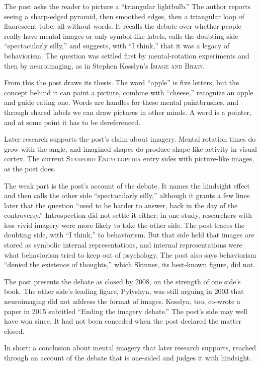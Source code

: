 \begin{afterword}
\summaryhead

The post asks the reader to picture a ``triangular lightbulb.'' The author reports seeing a sharp-edged pyramid, then smoothed edges, then a triangular loop of fluorescent tube, all without words. It recalls the debate over whether people really have mental images or only symbol-like labels, calls the doubting side ``spectacularly silly,'' and suggests, with ``I think,'' that it was a legacy of behaviorism. The question was settled first by mental-rotation experiments and then by neuroimaging, as in Stephen Kosslyn's \textsc{Image and Brain}.

From this the post draws its thesis. The word ``apple'' is five letters, but the concept behind it can paint a picture, combine with ``cheese,'' recognize an apple and guide eating one. Words are handles for these mental paintbrushes, and through shared labels we can draw pictures in other minds. A word is a pointer, and at some point it has to be dereferenced.

\responsehead

Later research supports the post's claim about imagery. Mental rotation times do grow with the angle, and imagined shapes do produce shape-like activity in visual cortex. The current \textsc{Stanford Encyclopedia} entry sides with picture-like images, as the post does.

The weak part is the post's account of the debate. It names the hindsight effect and then calls the other side ``spectacularly silly,'' although it grants a few lines later that the question ``used to be harder to answer, back in the day of the controversy.'' Introspection did not settle it either; in one study, researchers with less vivid imagery were more likely to take the other side. The post traces the doubting side, with ``I think,'' to behaviorism. But that side held that images are stored as symbolic internal representations, and internal representations were what behaviorism tried to keep out of psychology. The post also says behaviorism ``denied the existence of thoughts,'' which Skinner, its best-known figure, did not.

The post presents the debate as closed by 2008, on the strength of one side's book. The other side's leading figure, Pylyshyn, was still arguing in 2003 that neuroimaging did not address the format of images. Kosslyn, too, co-wrote a paper in 2015 subtitled ``Ending the imagery debate.'' The post's side may well have won since. It had not been conceded when the post declared the matter closed.

In short: a conclusion about mental imagery that later research supports, reached through an account of the debate that is one-sided and judges it with hindsight.
\end{afterword}
